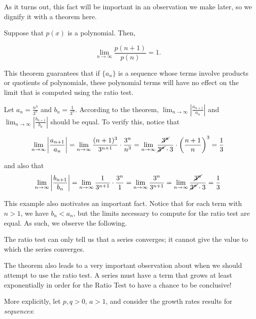 \documentclass{ximera}
\begin{document}
As it turns out, this fact will be important in an observation we make later, so we dignify it with a theorem here.

\begin{theorem}
Suppose that $p(x)$ is a polynomial.  Then,

\[
\lim_{n \to \infty} \frac{p(n+1)}{p(n)} = 1.
\]
\end{theorem}

This theorem guarantees that if $\{a_n\}$ is a sequence whose terms involve products or quotients of polynomials, these polynomial terms will have no effect on the limit that is computed using the ratio test.  

\begin{example}
Let $a_n = \frac{n^3}{3^n}$ and $b_n = \frac{1}{3^n}$.  According to the theorem,  $\lim_{n \to \infty} \left|\frac{a_{n+1}}{a_n}\right|$ and $ \lim_{n \to \infty} \left|\frac{b_{n+1}}{b_n}\right|$ should be equal.  To verify this, notice that 

\[
 \lim_{n \to \infty} \left|\frac{a_{n+1}}{a_n}\right| =  \lim_{n \to \infty} \frac{(n+1)^3}{3^{n+1}} \cdot \frac{3^n}{n^3} =  \lim_{n \to \infty} \frac{\cancel{3^n}}{\cancel{3^n} \cdot 3} \cdot \left(\frac{n+1}{n}\right)^3 = \frac{1}{3}
\]

and also that 
\[
 \lim_{n \to \infty} \left|\frac{b_{n+1}}{b_n}\right| =  \lim_{n \to \infty} \frac{1}{3^{n+1}} \cdot \frac{3^n}{1} =   \lim_{n \to \infty} \frac{3^n}{3^{n+1}} = \lim_{n \to \infty} \frac{\cancel{3^n}}{\cancel{3^n} \cdot 3} = \frac{1}{3}
\]

\end{example} 

This example also motivates an important fact.  Notice that for each term with $n >1$, we have $b_n < a_n$, but the limits necessary to compute for the ratio test are equal.  As such, we observe the following.

\begin{fact}
The ratio test can only tell us that a series converges; it cannot give the value to which the series converges.
\end{fact}

The theorem also leads to a very important observation about when we should attempt to use the ratio test.  A series must have a term that grows at least exponentially in order for the Ratio Test to have a chance to be conclusive!  

More explicitly, let $p, q > 0$, $a>1$, and consider the growth rates results for \emph{sequences}:
\end{document}
